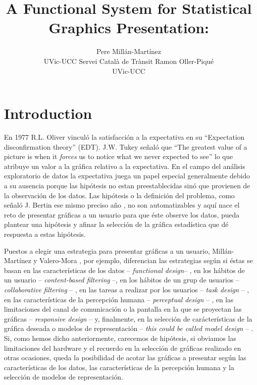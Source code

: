 \documentclass[jss]{jss}
\author{
Pere Millán-Martínez\\UVic-UCC Servei Català de Trànsit \And Ramon Oller-Piqué\\UVic-UCC
}
\title{A Functional System for Statistical Graphics Presentation: \pkg{brinton}}
\begin{document}
\hypertarget{introduction}{%
\section{Introduction}\label{introduction}}

En 1977 R.L. Oliver \citeyearpar{Oliver1977} vinculó la satisfacción a
la expectativa en su ``Expectation disconfirmation theory'' (EDT). J.W.
Tukey señaló que ``The greatest value of a picture is when it
\emph{forces} us to notice what we never expected to see''
\citep[p.iv]{Tukey1977} lo que atribuye un valor a la gráfica relativo a
la expectativa. En el campo del análisis exploratorio de datos la
expectativa juega un papel especial generalmente debido a su ausencia
porque las hipótesis no estan preestablecidas sinó que provienen de la
observación de los datos. Las hipótesis o la definición del problema,
como señaló J. Bertin ese mismo preciso año \citep[p.2]{Bertin1977}, no
son automatizables y aquí nace el reto de presentar gráficas a un
usuario para que éste observe los datos, pueda plantear una hipótesis y
afinar la selección de la gráfica estadística que dé respuesta a estas
hipótesis.

Puestos a elegir una estrategia para presentar gráficas a un usuario,
Millán-Martínez y Valero-Mora \citeyearpar{Millan2018}, por ejemplo,
diferencian las estrategias según si éstas se basan en las
características de los datos -- \emph{functional design}--
\citep[\citet{Gnanamgari1981}, \citet{Kamps1999},
\citet{ValeroMora2012}]{Benson1977}, en los hábitos de un usuario --
\emph{content-based filtering} --, en los hábitos de un grup de usuarios
-- \emph{collaborative filtering} -- \citep{Mutlu2015}, en las tareas a
realizar por los usuarios -- \emph{task design} --
\citep[\citet{Casner1991}]{Bowman1967}, en las características de la
percepción humana -- \emph{perceptual design} --
\citep[\citet{Mackinlay1986}]{Cleveland1984}, en las limitaciones del
canal de comunicación o la pantalla en la que se proyectan las gráficas
-- \emph{responsive design} -- \citep{Gnanamgari1981} y, finalmente, en
la selección de carácterísticas de la gráfica deseada o modelos de
representación -- \emph{this could be called model design} --
\citep{Roth1994}. Si, como hemos dicho anteriormente, carecemos de
hipótesis, si obviamos las limitaciones del hardware y el recuerdo en la
selección de gráficas realizado en otras ocasiones, queda la posibilidad
de acotar las gráficas a presentar según las características de los
datos, las características de la percepción humana y la selección de
modelos de representación.
\end{document}
